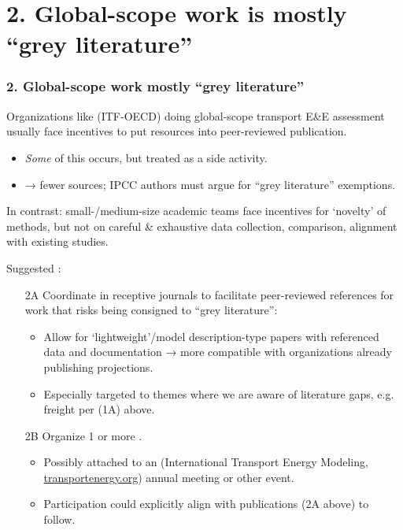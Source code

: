 \documentclass[12pt,aspectratio=169]{beamer}
\begin{document}
\section{2. Global-scope work is mostly “grey literature”}
\begin{frame}[allowframebreaks]
\frametitle{2. Global-scope work mostly “grey literature”}
Organizations like (ITF-OECD) doing global-scope transport E\&E assessment usually  face incentives to put resources into peer-reviewed publication.
\begin{itemize}
  \item \emph{Some} of this occurs, but treated as a side activity.
  \item → fewer sources; IPCC authors must argue for “grey literature” exemptions.
\end{itemize}

\medskip
In contrast: small-/medium-size academic teams face incentives for ‘novelty’ of methods, but not on careful \& exhaustive data collection, comparison, alignment with existing studies.

\framebreak
Suggested :
\begin{enumerate}
  \item [2A] Coordinate  in receptive journals to facilitate peer-reviewed references for work that risks being consigned to “grey literature”:
    \begin{itemize}
      \item Allow for ‘lightweight’/model description-type papers with referenced data and documentation → more compatible with organizations already publishing projections.
      \item Especially targeted to themes where we are aware of literature gaps, e.g. freight per (1A) above.
    \end{itemize}
  \item [2B] Organize 1 or more .
    \begin{itemize}
      \item Possibly attached to an  (International Transport Energy Modeling, \href{https://transportenergy.org}{transportenergy.org}) annual meeting or other event.
      \item Participation could explicitly align with publications (2A above) to follow.
    \end{itemize}
\end{enumerate}

\end{frame}
\end{document}
